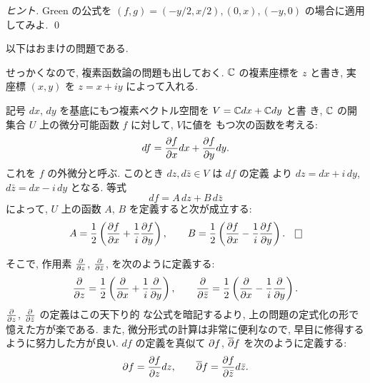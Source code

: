 \documentclass[12pt,twoside]{jarticle}
\begin{document}
\begin{proof}[ヒント]
 Green の公式を $(f,g)=(-y/2,x/2),(0,x),(-y,0)$ の場合に適用してみよ.
 \qed
\end{proof}


以下はおまけの問題である.

せっかくなので, 複素函数論の問題も出しておく. ${\mathbb C}$ の複素座標を $z$ と書き,
実座標 $(x,y)$ を $z=x+iy$ によって入れる.

\begin{question}
  記号 $dx$, $dy$ を基底にもつ複素ベクトル空間を $V={\mathbb C} dx+{\mathbb C} dy$ と書
  き, ${\mathbb C}$ の開集合 $U$ 上の微分可能函数 $f$ に対して, $V$に値を
  もつ次の函数を考える:
  \[
    df = \frac{\partial f}{\partial x}dx + \frac{\partial f}{\partial y}dy.
  \]%
  これを $f$ の外微分と呼ぶ. このとき $dz,d\bar{z}\in V$ は $df$ の定義
  より $dz=dx+i\,dy$, $d\bar{z}=dx-i\,dy$ となる. 等式
  \[
    df = A\,dz + B\,d\bar{z}
  \]%
  によって, $U$ 上の函数 $A$, $B$ を定義すると次が成立する:
  \[
    A =
    \frac{1}{2}
    \left(
      \frac{\d f}{\d x} + \frac{1}{i} \frac{\d f}{\d y}
    \right),
    \qquad
    B =
    \frac{1}{2}
    \left(
      \frac{\d f}{\d x} - \frac{1}{i} \frac{\d f}{\d y}
    \right). 
    \qed
  \]%
\end{question}

\noindent そこで, 作用素 $\frac{\partial}{\partial z}$,
$\frac{\partial}{\partial\bar{z}}$, を次のように定義する:
\[
  \frac{\partial}{\partial z} =
  \frac{1}{2}
  \left( \frac{\partial}{\partial x} + \frac{1}{i} \frac{\partial}{\partial y} \right),
  \qquad
  \frac{\partial}{\partial\bar z} =
  \frac{1}{2}
  \left( \frac{\partial}{\partial x} - \frac{1}{i} \frac{\partial}{\partial y} \right).
\]%
$\frac{\partial}{\partial z}$, $\frac{\partial}{\partial\bar{z}}$ の定義はこの天下り的
な公式を暗記するより, 上の問題の定式化の形で憶えた方が楽である. また, 
微分形式の計算は非常に便利なので, 早目に修得するように努力した方が良い. 
$df$ の定義を真似て $\partial f$, ${\overline\partial} f$ を次のように定義する:
\[
  \partial f = \frac{\partial f}{\partial z}dz,
  \qquad
  {\overline\partial} f = \frac{\partial f}{\partial\bar z}d\bar{z}.
\]%
\end{document}
